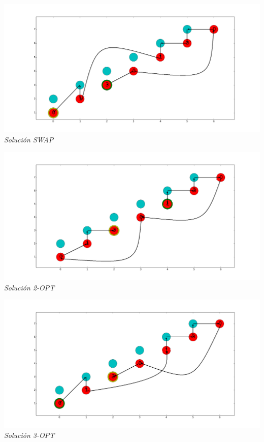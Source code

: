\vspace*{0.3cm} \vspace*{0.3cm}
  \begin{center}
 \includegraphics[scale=0.3]{./EJ3/gym0swap.png}\\
 {            \textit{Soluci\'on SWAP}}
  \end{center}
  \vspace*{0.3cm}

\vspace*{0.3cm} \vspace*{0.3cm}
  \begin{center}
 \includegraphics[scale=0.3]{./EJ3/gym02opt.png}\\
 {            \textit{Soluci\'on 2-OPT}}
  \end{center}
  \vspace*{0.3cm}

\vspace*{0.3cm} \vspace*{0.3cm}
  \begin{center}
 \includegraphics[scale=0.3]{./EJ3/gym03opt.png}\\
 {            \textit{Soluci\'on 3-OPT}}
  \end{center}
  \vspace*{0.3cm}
  
